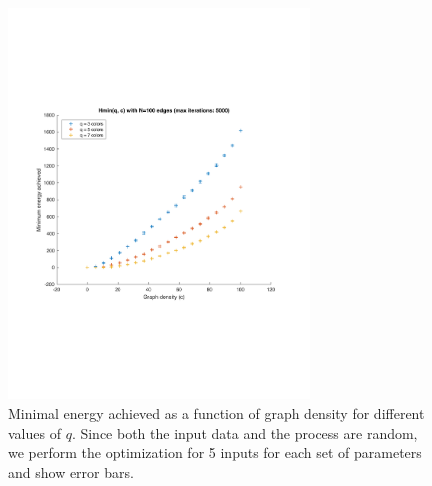 \documentclass{report}
\begin{document}
  \begin{figure}
    \begin{center}
      \includegraphics[width=8cm]{figures/cost-vs-graph-density.pdf}
    \end{center}
    \label{Fig:cost-vs-density}
    \caption{Minimal energy achieved as a function of graph density for different values of $q$. Since both the input data and the process are random, we perform the optimization for 5 inputs for each set of parameters and show error bars.}
  \end{figure}
\end{document}
